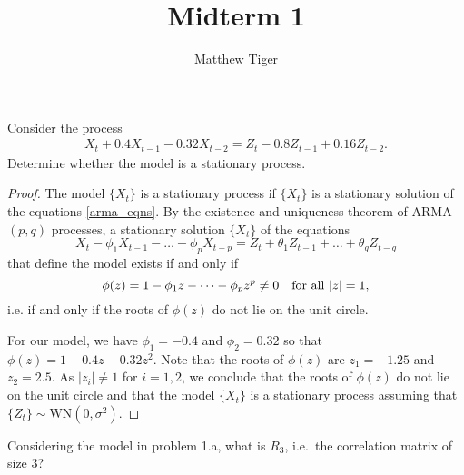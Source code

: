 \documentclass[12pt]{article}
\title{Midterm 1}
\author{Matthew Tiger}
\theoremstyle{definition}
\newenvironment{custompbm}[1]
  {\renewcommand\theproblem{#1}\problem}
  {\endproblem}
\begin{document}
\maketitle


\begin{custompbm}{1.a}
  Consider the process
  \begin{align}\label{arma_eqns}
    X_t + 0.4X_{t-1} - 0.32X_{t-2} = Z_t -0.8Z_{t-1} + 0.16 Z_{t-2}.
  \end{align}
  Determine whether the model is a stationary process.
\end{custompbm}

\begin{proof}
  The model $\{X_t\}$ is a stationary process if $\{X_t\}$ is a stationary solution
  of the equations \eqref{arma_eqns}. By the existence and uniqueness theorem
  of ARMA$(p, q)$ processes, a stationary solution $\{X_t\}$ of the equations
  \[
    X_t - \phi_1X_{t-1} - \dots - \phi_pX_{t-p} = Z_t + \theta_1Z_{t-1} + \dots + \theta_q Z_{t-q}
  \]
  that define the model exists if and only if
  \[
    \phi(z) = 1 - \phi_1 z - \dots - \phi_p z^p \neq 0 \text{\quad for all $|z| = 1,$}
  \]
  i.e. if and only if the roots of $\phi(z)$ do not lie on the unit circle.

  For our model, we have $\phi_1 = -0.4$ and $\phi_2 = 0.32$ so that $\phi(z) = 1 + 0.4z - 0.32z^2$.
  Note that the roots of $\phi(z)$ are $z_1 = -1.25$ and $z_2 = 2.5$. As $|z_i| \neq 1$ for $i=1,2$,
  we conclude that the roots of $\phi(z)$ do not lie on the unit circle and that
  the model $\{X_t\}$ is a stationary process assuming that $\{Z_t\} \sim \text{WN}(0, \sigma^2)$.
\end{proof}


\begin{custompbm}{1.b}
  Considering the model in problem 1.a, what is $R_3$, i.e.\ the correlation
  matrix of size 3?
\end{custompbm}
\end{document}
